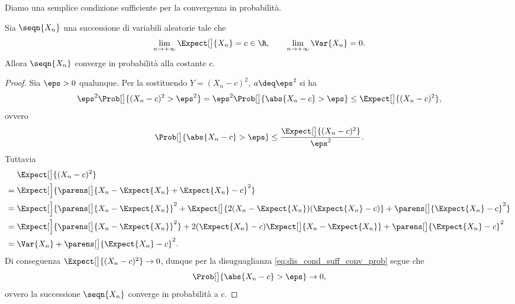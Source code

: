 Diamo una semplice condizione sufficiente per la convergenza in probabilità.
\begin{proposition}
    \label{prop:cond_suff_conv_prob} Sia $\seqn{X_n}$ una successione di variabili aleatorie tale che \[
        \lim_{n \to +\infty} \Expect[\big]{X_n} = c \in \R, \qquad \lim_{n \to +\infty} \Var{X_n} = 0.    
    \] Allora $\seqn{X_n}$ converge in probabilità alla costante $c$.
\end{proposition}
\begin{proof}
    Sia $\eps > 0$ qualunque. Per la  sostituendo $Y = (X_n - c)^2$, $a \deq \eps^2$ si ha \[
        \eps^2\Prob[\big]{(X_n - c)^2 > \eps^2} = \eps^2\Prob[\big]{\abs{X_n - c} > \eps} \leq \Expect[\big]{(X_n - c)^2},
    \] ovvero \begin{equation}
        \Prob[\big]{\abs{X_n - c} > \eps} \leq \frac{\Expect[\big]{(X_n - c)^2}}{\eps^2}. \label{eq:dis_cond_suff_conv_prob}
    \end{equation} Tuttavia \begin{align*}
        &\Expect[\big]{(X_n - c)^2}\\
        = {}&\Expect[\Big]{\parens[\big]{X_n - \Expect{X_n} + \Expect{X_n} - c}^2}\\
        = {}&\Expect[\Big]{\parens[\big]{X_n - \Expect{X_n}}^2 + \Expect[\big]{2(X_n - \Expect{X_n})(\Expect{X_n} - c)} + \parens[\big]{\Expect{X_n} - c}^2}\\
        = {}&\Expect[\Big]{\parens[\big]{X_n - \Expect{X_n}}^2} + 2(\Expect{X_n} - c)\Expect[\big]{X_n - \Expect{X_n}} + \parens[\big]{\Expect{X_n} - c}^2\\
        = {}&\Var{X_n} + \parens[\big]{\Expect{X_n} - c}^2.
    \end{align*}
    Di conseguenza $\Expect[\big]{(X_n - c)^2} \to 0$, dunque per la disuguaglianza \eqref{eq:dis_cond_suff_conv_prob} segue che \[
        \Prob[\big]{\abs{X_n - c} > \eps} \to 0,
    \] ovvero la successione $\seqn{X_n}$ converge in probabilità a $c$.
\end{proof}

